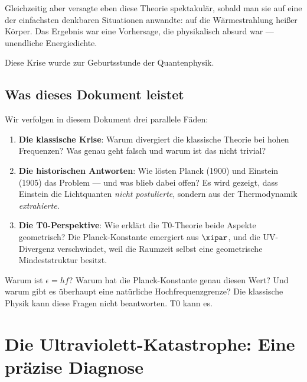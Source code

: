 Gleichzeitig aber versagte eben diese Theorie spektakulär, sobald man sie auf eine der 
einfachsten denkbaren Situationen anwandte: auf die Wärmestrahlung heißer Körper. Das 
Ergebnis war eine Vorhersage, die physikalisch absurd war — unendliche Energiedichte.

Diese Krise wurde zur Geburtsstunde der Quantenphysik.

\subsection{Was dieses Dokument leistet}

Wir verfolgen in diesem Dokument drei parallele Fäden:

\begin{enumerate}
    \item \textbf{Die klassische Krise}: Warum divergiert die klassische Theorie bei 
    hohen Frequenzen? Was genau geht falsch und warum ist das nicht trivial?
    
    \item \textbf{Die historischen Antworten}: Wie lösten Planck (1900) und Einstein 
    (1905) das Problem — und was blieb dabei offen? Es wird gezeigt, dass Einstein 
    die Lichtquanten \emph{nicht postulierte}, sondern aus der Thermodynamik 
    \emph{extrahierte}.
    
    \item \textbf{Die T0-Perspektive}: Wie erklärt die T0-Theorie beide Aspekte 
    geometrisch? Die Planck-Konstante emergiert aus $\xipar$, und die UV-Divergenz 
    verschwindet, weil die Raumzeit selbst eine geometrische Mindeststruktur besitzt.
\end{enumerate}

\begin{important}[Leitfrage]
    Warum ist $\epsilon = hf$? Warum hat die Planck-Konstante genau diesen Wert? 
    Und warum gibt es überhaupt eine natürliche Hochfrequenzgrenze? 
    Die klassische Physik kann diese Fragen nicht beantworten. T0 kann es.
\end{important}

\clearpage

\section{Die Ultraviolett-Katastrophe: Eine präzise Diagnose}
\label{sec:uv_catastrophe}

